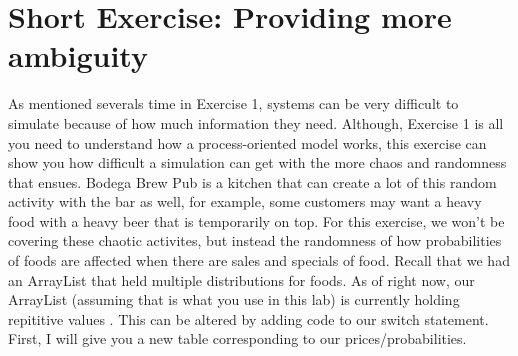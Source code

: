 \documentclass[11pt]{article}
\begin{document}
\section*{Short Exercise: Providing more ambiguity}
As mentioned severals time in Exercise 1, systems can be very difficult to simulate because of how much information they need.
Although, Exercise 1 is all you need to understand how a process-oriented model works, this exercise can show you how difficult a simulation can get
with the more chaos and randomness that ensues.
\newline
Bodega Brew Pub is a kitchen that can create a lot of this random activity with the bar as well, for example, some customers may want a heavy food with
a heavy beer that is temporarily on top. For this exercise, we won't be covering these chaotic activites, but instead the randomness of how probabilities
of foods are affected when there are sales and specials of food.
\newline
Recall that we had an ArrayList that held multiple distributions for foods. As of right now, our ArrayList (assuming that is what you use in this lab) is currently
holding repititive values . This can be altered by adding code to our switch statement. First, I will give you a new table corresponding to our prices/probabilities.
\end{document}
